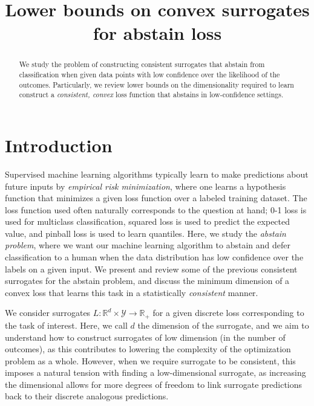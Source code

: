 \documentclass[anon,12pt]{colt2021} %
\title{Lower bounds on convex surrogates for abstain loss}
\newcommand{\reals}{\mathbb{R}}
\newcommand{\Y}{\mathcal{Y}}
\begin{document}
\maketitle

\begin{abstract}
We study the problem of constructing consistent surrogates that abstain from classification when given data points with low confidence over the likelihood of the outcomes.
Particularly, we review lower bounds on the dimensionality required to learn construct a \emph{consistent, convex} loss function that abstains in low-confidence settings.
\end{abstract}

\section{Introduction}
Supervised machine learning algorithms typically learn to make predictions about future inputs by \emph{empirical risk minimization}, where one learns a hypothesis function that minimizes a given loss function over a labeled training dataset.
The loss function used often naturally corresponds to the question at hand; 0-1 loss is used for multiclass classification, squared loss is used to predict the expected value, and pinball loss is used to learn quantiles.
Here, we study the \emph{abstain problem}, where we want our machine learning algorithm to abstain and defer classification to a human when the data distribution has low confidence over the labels on a given input.
We present and review some of the previous consistent surrogates for the abstain problem, and discuss the minimum dimension of a convex loss that learns this task in a statistically \emph{consistent} manner.

We consider surrogates $L:\reals^d \times \Y \to \reals_+$ for a given discrete loss corresponding to the task of interest.
Here, we call $d$ the dimension of the surrogate, and we aim to understand how to construct surrogates of low dimension (in the number of outcomes), as this contributes to lowering the complexity of the optimization problem as a whole.
However, when we require surrogate to be consistent, this imposes a natural tension with finding a low-dimensional surrogate, as increasing the dimensional allows for more degrees of freedom to link surrogate predictions back to their discrete analogous predictions.
\end{document}
